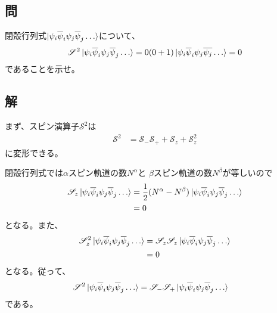 \subsection{問}
閉殻行列式$\ket{{\psi}_i{\overline{\psi}}_i{\psi}_j{\overline{\psi}}_j\dots}$について、
\begin{align}
	\mathscr{S}^2 \ket{{\psi}_i{\overline{\psi}}_i{\psi}_j{\overline{\psi}}_j\dots}
=
	0 (0+1) \ket{{\psi}_i{\overline{\psi}}_i{\psi}_j{\overline{\psi_j}}\dots}
=
	0
\end{align}
であることを示せ。

\subsection{解}
まず、スピン演算子$\mathscr{S}^2$は
\begin{align}
	\mathscr{S}^2
&=
	\mathscr{S}_- \mathscr{S}_+
	+
	\mathscr{S}_z
	+
	\mathscr{S}_z^2
\end{align}
に変形できる。

閉殻行列式では$\alpha$スピン軌道の数$N^{\alpha}$と
$\beta$スピン軌道の数$N^{\beta}$が等しいので
\begin{align}
	\mathscr{S}_z \ket{\aorb{\psi}_i\borb{\psi}_i\aorb{\psi}_j\borb{\psi}_j\dots}
&=
	\frac{1}{2}
	(N^{\alpha} -N^{\beta})
	\ket{\aorb{\psi}_i\borb{\psi}_i\aorb{\psi}_j\borb{\psi}_j\dots} \\
%
%
&=
	0
\end{align}
となる。また、
\begin{align}
	\mathscr{S}_z^2 \ket{\aorb{\psi}_i\borb{\psi}_i\aorb{\psi}_j\borb{\psi}_j\dots}
&=
	\mathscr{S}_z \mathscr{S}_z
		\ket{\aorb{\psi}_i\borb{\psi}_i\aorb{\psi}_j\borb{\psi}_j\dots} \\
%
%
&=
	0
\end{align}
となる。従って、
\begin{align}
	\mathscr{S}^2 \ket{{\psi}_i{\overline{\psi}}_i{\psi}_j{\overline{\psi}}_j\dots}
&=
	\mathscr{S}_- \mathscr{S}_+
		\ket{{\psi}_i{\overline{\psi}}_i{\psi}_j{\overline{\psi}}_j\dots}
\end{align}
である。


